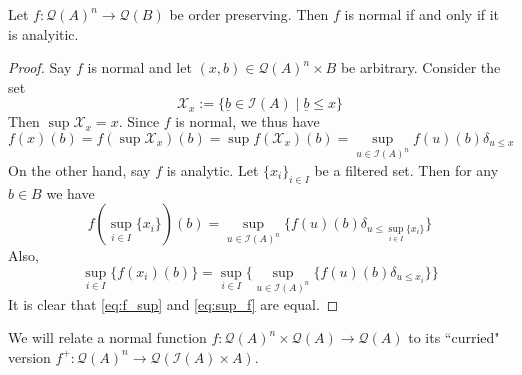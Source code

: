 \documentclass[runningheads]{llncs}
\newcommand{\scr}[1]{\mathscr{#1}}
\newcommand{\call}[1]{\mathcal{#1}}
\newcommand{\Ical}{\call{I}}
\newcommand{\Qcal}{\call{Q}}
\newcommand{\lto}{\longrightarrow}
\begin{document}
\begin{theorem}\label{theorem:normal_analytic}
	Let $f: \Qcal(A)^n \lto \Qcal(B)$ be order preserving. Then $f$ is normal if and only if it is analyitic.
	\end{theorem}
\begin{proof}
	Say $f$ is normal and let $(x,b) \in \Qcal(A)^n \times B$ be arbitrary. Consider the set
	\begin{equation}
		\scr{X}_x := \{ \underline{b} \in \Ical(A) \mid \underline{b} \leq x \}
		\end{equation}
	Then $\operatorname{sup} \scr{X}_x = x$. Since $f$ is normal, we thus have
	\begin{equation}
		f(x)(b) = f(\operatorname{sup}\scr{X}_x)(b) = \operatorname{sup}f(\scr{X}_x)(b) = \operatorname{sup}_{u \in \Ical(A)^n}f(u)(b)\delta_{u \leq x}
		\end{equation}
	On the other hand, say $f$ is analytic. Let $\{ x_i \}_{i \in I}$ be a filtered set. Then for any $b \in B$ we have
	\begin{equation}\label{eq:f_sup}
		f(\operatorname{sup}_{i \in I}\{ x_i \})(b) = \operatorname{sup}_{u \in \Ical(A)^n}\big\{f(u)(b)\delta_{u \leq \operatorname{sup}_{i \in I}\{ x_i \}}\big\}
		\end{equation}
	Also,
	\begin{equation}\label{eq:sup_f}
		\operatorname{sup}_{i \in I}\{ f(x_i)(b) \} = \operatorname{sup}_{i \in I}\big\{ \operatorname{sup}_{u \in \Ical(A)^n}\{ f(u)(b)\delta_{u \leq x_i}\} \big\}
		\end{equation}
	It is clear that \eqref{eq:f_sup} and \eqref{eq:sup_f} are equal.
	\end{proof}
	We will relate a normal function $f: \Qcal(A)^{n} \times \Qcal(A) \lto \Qcal(A)$ to its ``curried" version $f^+: \Qcal(A)^n \lto \Qcal(\Ical(A) \times A)$.
	
\end{document}
